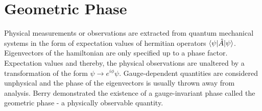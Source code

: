 %

\chapter{Geometric Phase}
Physical measurements or observations are extracted from quantum mechanical systems in the form of expectation values of hermitian operators $\braket{\psi|\hat{A}|\psi}$.
Eigenvectors of the hamiltonian are only specified up to a phase factor. Expectation values and thereby, the physical observations are unaltered by a transformation of the form 
$\psi \rightarrow e^{i \phi} \psi$. Gauge-dependent quantities are considered unphysical and the phase of the eigenvectors is usually thrown away from analysis. Berry
demonstrated the existence of a gauge-invariant phase called the geometric phase - a physically observable quantity.

